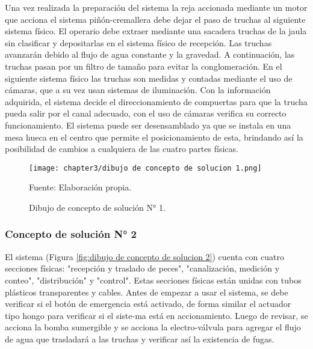 Una vez realizada la preparación del sistema la reja accionada mediante un motor que acciona el sistema piñón-cremallera debe dejar el paso de truchas al siguiente sistema físico. El operario debe extraer mediante una sacadera truchas de la jaula sin clasificar y depositarlas en el sistema físico de recepción. Las truchas avanzarán debido al flujo de agua constante y la gravedad. A continuación, las truchas pasan por un filtro de tamaño para evitar la conglomeración. En el siguiente sistema físico las truchas son medidas y contadas mediante el uso de cámaras, que a su vez usan sistemas de iluminación. Con la información adquirida, el sistema decide el direccionamiento de compuertas para que la trucha pueda salir por el canal adecuado, con el uso de cámaras verifica su correcto funcionamiento.
El sistema puede ser desensamblado ya que se instala en una mesa hueca en el centro que permite el posicionamiento de esta, brindando así la posibilidad de cambios a cualquiera de las cuatro partes físicas.


\begin{figure}[H]
	\centering
	\texttt{[image: chapter3/dibujo de concepto de solucion 1.png]}
	\caption{Dibujo de concepto de solución N° 1.}
	Fuente: Elaboración propia.
	\label{fig:dibujo de concepto de solucion 1}
\end{figure}


\subsubsection{Concepto de solución N° 2}

El sistema (Figura \ref{fig:dibujo de concepto de solucion 2}) cuenta con cuatro secciones físicas: "recepción y traslado de peces", "canalización, medición y conteo", "distribución" y "control". Estas secciones físicas están unidas con tubos plásticos transparentes y cables. Antes de empezar a usar el sistema, se debe verificar si el botón de emergencia está activado, de forma similar el actuador tipo hongo para verificar si el siste-ma está en accionamiento. Luego de revisar, se acciona la bomba sumergible y se acciona la electro-válvula para agregar el flujo de agua que trasladará a las truchas y verificar así la existencia de fugas.

